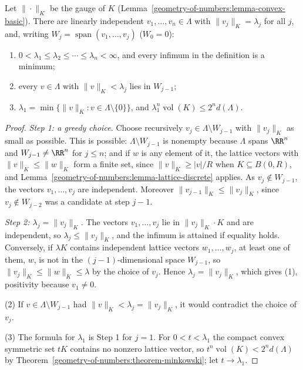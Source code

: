 \begin{proposition}\label{geometry-of-numbers:proposition-successive-minima}
Let $\|\cdot\|_K$ be the gauge of $K$ (Lemma~\ref{geometry-of-numbers:lemma-convex-basic}). There are linearly independent $v_1, \ldots, v_n \in \Lambda$ with $\|v_j\|_K = \lambda_j$ for all $j$, and,
writing $W_j = \operatorname{span}(v_1, \ldots, v_j)$ ($W_0 = 0$):
\begin{enumerate}
\item $0 < \lambda_1 \leq \lambda_2 \leq \cdots \leq \lambda_n < \infty$, and every infimum in the definition is a minimum;
\item every $v \in \Lambda$ with $\|v\|_K < \lambda_j$ lies in $W_{j-1}$;
\item $\lambda_1 = \min\{\|v\|_K : v \in \Lambda \setminus \{0\}\}$, and $\lambda_1^n\operatorname{vol}(K) \leq 2^nd(\Lambda)$.
\end{enumerate}
\end{proposition}

\begin{proof}
\emph{Step 1: a greedy choice.} Choose recursively $v_j \in \Lambda \setminus W_{j-1}$ with $\|v_j\|_K$ as small as possible. This is possible: $\Lambda \setminus W_{j-1}$ is nonempty because $\Lambda$ spans
$\RR^n$ and $W_{j-1} \neq \RR^n$ for $j \leq n$; and if $w$ is any element of it, the lattice vectors with $\|v\|_K \leq \|w\|_K$ form a finite set, since $\|v\|_K \geq |v|/R$ when
$K \subseteq B(0, R)$, and Lemma~\ref{geometry-of-numbers:lemma-lattice-discrete} applies. As $v_j \notin W_{j-1}$, the vectors $v_1, \ldots, v_j$ are independent. Moreover
$\|v_{j-1}\|_K \leq \|v_j\|_K$, since $v_j \notin W_{j-2}$ was a candidate at step $j - 1$.

\emph{Step 2: $\lambda_j = \|v_j\|_K$.} The vectors $v_1, \ldots, v_j$ lie in $\|v_j\|_K\cdot K$ and are independent, so $\lambda_j \leq \|v_j\|_K$, and the infimum is attained if equality holds.
Conversely, if $\lambda K$ contains independent lattice vectors $w_1, \ldots, w_j$, at least one of them, $w$, is not in the $(j - 1)$-dimensional space $W_{j-1}$, so
$\|v_j\|_K \leq \|w\|_K \leq \lambda$ by the choice of $v_j$. Hence $\lambda_j = \|v_j\|_K$, which gives (1), positivity because $v_1 \neq 0$.

(2) If $v \in \Lambda \setminus W_{j-1}$ had $\|v\|_K < \lambda_j = \|v_j\|_K$, it would contradict the choice of $v_j$.

(3) The formula for $\lambda_1$ is Step 1 for $j = 1$. For $0 < t < \lambda_1$ the compact convex symmetric set $tK$ contains no nonzero lattice vector, so $t^n\operatorname{vol}(K) < 2^nd(\Lambda)$ by
Theorem~\ref{geometry-of-numbers:theorem-minkowski}; let $t \to \lambda_1$.
\end{proof}

